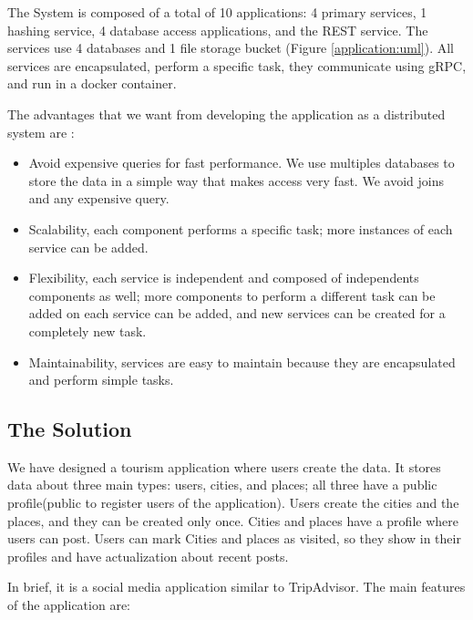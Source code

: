 The System is composed of a total of 10 applications: 4 primary services, 1 hashing service, 4 database access applications, and the REST service. The services use  4 databases and 1 file storage bucket (Figure \ref{application:uml}). All services are encapsulated, perform a specific task, they communicate using gRPC, and run in a docker container.

The advantages that we want from developing the application as a distributed system are \cite{dsbook}:

\begin{itemize}
	\item Avoid expensive queries for fast performance. We use multiples databases to store the data in a simple way that makes access very fast. We avoid joins and any expensive query.
	
	\item	Scalability, each component performs a specific task; more instances of each service can be added.
	
	\item	Flexibility, each service is independent and composed of independents components as well; more components to perform a different task can be added on each service can be added, and new services can be created for a completely new task.
	
	\item Maintainability, services are easy to maintain because they are encapsulated and perform simple tasks.
	
\end{itemize}



\subsection{The Solution}
\indent
\indent
We have designed a tourism application where users create the data.  It stores data about three main types: users, cities, and places; all three have a public profile(public to register users of the application). Users create the cities and the places, and they can be created only once. Cities and places have a profile where users can post. Users can mark Cities and places as visited, so they show in their profiles and have actualization about recent posts.

In brief, it is a social media application similar to TripAdvisor. The main features of the application are:



